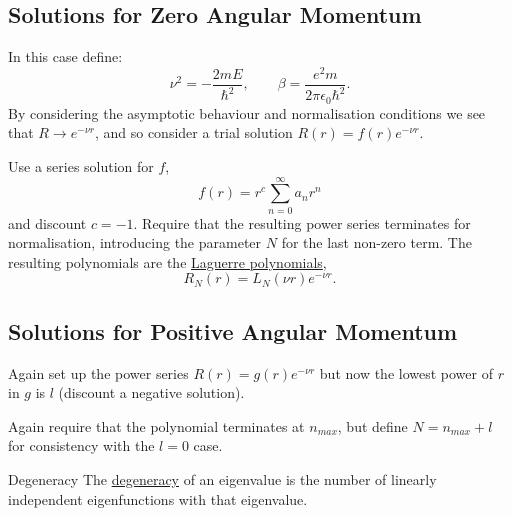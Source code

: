 \documentclass[../Main.tex]{subfiles}
\begin{document}
\subsection{Solutions for Zero Angular Momentum}
In this case define:
\begin{equation*}
    \nu^2 = -\frac{2mE}{\hbar^2},\qquad \beta = \frac{e^2m}{2\pi \epsilon_0 \hbar^2}.
\end{equation*}
By considering the asymptotic behaviour and normalisation conditions we see that $R \to e^{-\nu r}$, and so consider a trial solution $R(r) = f(r) e^{-\nu r}$.

Use a series solution for $f$,
\begin{equation*}
    f(r) = r^c \sum_{n=0}^{\infty} a_nr^n
\end{equation*}
and discount $c = -1$. Require that the resulting power series terminates for normalisation, introducing the parameter $N$ for the last non-zero term. The resulting polynomials are the \underline{Laguerre polynomials},
\begin{equation*}
    R_N(r) = L_N(\nu r) e^{-\nu r}.
\end{equation*}
\subsection{Solutions for Positive Angular Momentum}
Again set up the power series $R(r) = g(r) e^{-\nu r}$ but now the lowest power of $r$ in $g$ is $l$ (discount a negative solution).

Again require that the polynomial terminates at $n_{max}$, but define $N = n_{max} + l$ for consistency with the $l = 0$ case.

\begin{definition}{Degeneracy}
    The \underline{degeneracy} of an eigenvalue is the number of linearly independent eigenfunctions with that eigenvalue.
\end{definition}
\end{document}
